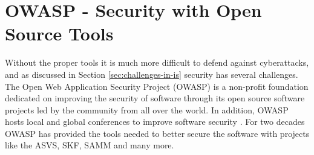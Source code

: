 \section{OWASP - Security with Open Source Tools}
Without the proper tools it is much more difficult to defend against cyberattacks, and as discussed in Section \ref{sec:challenges-in-is} security has several challenges. The Open Web Application Security Project (OWASP) is a non-profit foundation dedicated on improving the security of software through its open source software projects led by the community from all over the world. In addition, OWASP hosts local and global conferences to improve software security \cite{owasp_about}. For two decades OWASP has provided the tools needed to better secure the software with projects like the ASVS, SKF, SAMM and many more.

